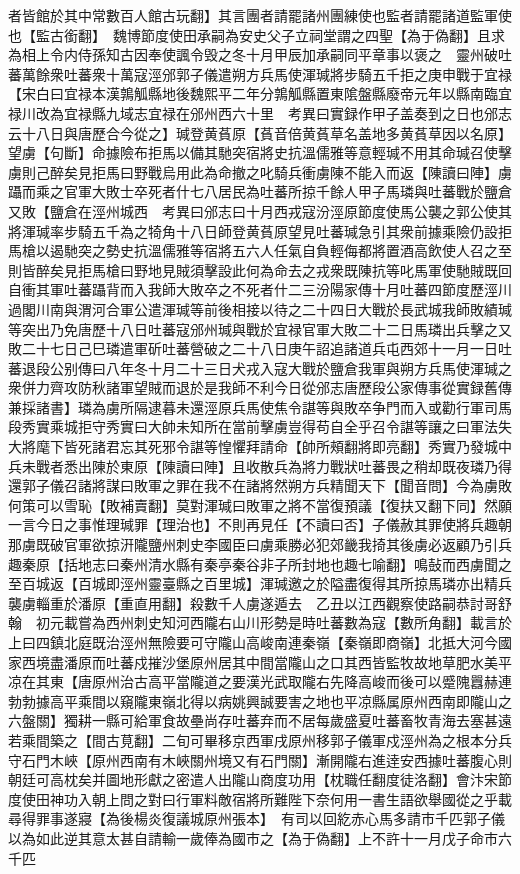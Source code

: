 者皆館於其中常數百人館古玩翻】其言團者請罷諸州團練使也監者請罷諸道監軍使也【監古銜翻】　魏博節度使田承嗣為安史父子立祠堂謂之四聖【為于偽翻】且求為相上令内侍孫知古因奉使諷令毁之冬十月甲辰加承嗣同平章事以褒之　靈州破吐蕃萬餘衆吐蕃衆十萬寇涇邠郭子儀遣朔方兵馬使渾瑊將步騎五千拒之庚申戰于宜禄【宋白曰宜禄本漢鶉觚縣地後魏熙平二年分鶉觚縣置東隂盤縣廢帝元年以縣南臨宜禄川改為宜禄縣九域志宜禄在邠州西六十里　考異曰實録作甲子盖奏到之日也邠志云十八日與唐歷合今從之】瑊登黄萯原【萯音倍黄萯草名盖地多黄萯草因以名原】望虜【句斷】命據險布拒馬以備其馳突宿將史抗溫儒雅等意輕瑊不用其命瑊召使擊虜則己醉矣見拒馬曰野戰烏用此為命撤之叱騎兵衝虜陳不能入而返【陳讀曰陣】虜躡而乘之官軍大敗士卒死者什七八居民為吐蕃所掠千餘人甲子馬璘與吐蕃戰於鹽倉又敗【鹽倉在涇州城西　考異曰邠志曰十月西戎寇汾涇原節度使馬公襲之郭公使其將渾瑊率步騎五千為之犄角十八日師登黄萯原望見吐蕃瑊急引其衆前據乘險仍設拒馬槍以遏馳突之勢史抗溫儒雅等宿將五六人任氣自負輕侮都將置酒高飲使人召之至則皆醉矣見拒馬槍曰野地見賊須擊設此何為命去之戎衆既陳抗等叱馬軍使馳賊既回自衝其軍吐蕃躡背而入我師大敗卒之不死者什二三汾陽家傳十月吐蕃四節度歷涇川過閣川南與渭河合軍公遣渾瑊等前後相接以待之二十四日大戰於長武城我師敗績瑊等突出乃免唐歷十八日吐蕃寇邠州瑊與戰於宜禄官軍大敗二十二日馬璘出兵擊之又敗二十七日己巳璘遣軍斫吐蕃營破之二十八日庚午詔追諸道兵屯西郊十一月一日吐蕃退段公别傳曰八年冬十月二十三日犬戎入寇大戰於鹽倉我軍與朔方兵馬使渾瑊之衆併力齊攻防秋諸軍望賊而退於是我師不利今日從邠志唐歷段公家傳事從實録舊傳兼採諸書】璘為虜所隔逮暮未還涇原兵馬使焦令諶等與敗卒争門而入或勸行軍司馬段秀實乘城拒守秀實曰大帥未知所在當前擊虜豈得苟自全乎召令諶等讓之曰軍法失大將麾下皆死諸君忘其死邪令諶等惶懼拜請命【帥所頰翻將即亮翻】秀實乃發城中兵未戰者悉出陳於東原【陳讀曰陣】且收散兵為將力戰狀吐蕃畏之稍却既夜璘乃得還郭子儀召諸將謀曰敗軍之罪在我不在諸將然朔方兵精聞天下【聞音問】今為虜敗何策可以雪恥【敗補賣翻】莫對渾瑊曰敗軍之將不當復預議【復扶又翻下同】然願一言今日之事惟理瑊罪【理治也】不則再見任【不讀曰否】子儀赦其罪使將兵趣朝那虜既破官軍欲掠汧隴鹽州刺史李國臣曰虜乘勝必犯郊畿我掎其後虜必返顧乃引兵趣秦原【括地志曰秦州清水縣有秦亭秦谷非子所封地也趣七喻翻】鳴鼔而西虜聞之至百城返【百城即涇州靈臺縣之百里城】渾瑊邀之於隘盡復得其所掠馬璘亦出精兵襲虜輜重於潘原【重直用翻】殺數千人虜遂遁去　乙丑以江西觀察使路嗣恭討哥舒翰　初元載嘗為西州刺史知河西隴右山川形勢是時吐蕃數為寇【數所角翻】載言於上曰四鎮北庭既治涇州無險要可守隴山高峻南連秦嶺【秦嶺即商嶺】北抵大河今國家西境盡潘原而吐蕃戍摧沙堡原州居其中間當隴山之口其西皆監牧故地草肥水美平凉在其東【唐原州治古高平當隴道之要漢光武取隴右先降高峻而後可以蹙隗囂赫連勃勃據高平乘間以窺隴東嶺北得以病姚興誠要害之地也平凉縣属原州西南即隴山之六盤關】獨耕一縣可給軍食故壘尚存吐蕃弃而不居每歲盛夏吐蕃畜牧青海去塞甚遠若乘間築之【間古莧翻】二旬可畢移京西軍戌原州移郭子儀軍戍涇州為之根本分兵守石門木峽【原州西南有木峽關州境又有石門關】漸開隴右進逹安西據吐蕃腹心則朝廷可高枕矣并圖地形獻之密遣人出隴山商度功用【枕職任翻度徒洛翻】會汴宋節度使田神功入朝上問之對曰行軍料敵宿將所難陛下奈何用一書生語欲舉國從之乎載尋得罪事遂寢【為後楊炎復議城原州張本】　有司以回紇赤心馬多請市千匹郭子儀以為如此逆其意太甚自請輸一歲俸為國市之【為于偽翻】上不許十一月戊子命市六千匹

